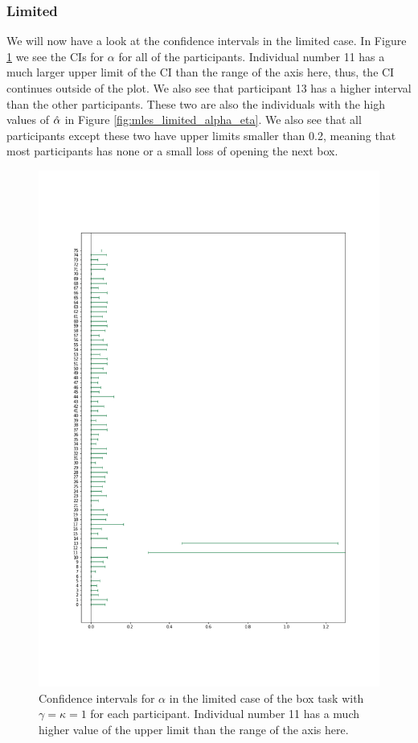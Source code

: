 \subsubsection{Limited}
We will now have a look at the confidence intervals in the limited case. In Figure \ref{fig:all_cis_alpha_lim} we see the CIs for $\alpha$ for all of the participants. Individual number 11 has a much larger upper limit of the CI than the range of the axis here, thus, the CI continues outside of the plot. We also see that participant 13 has a higher interval than the other participants. These two are also the individuals with the high values of $\hat{\alpha}$ in Figure \ref{fig:mles_limited_alpha_eta}. We also see that all participants except these two have upper limits smaller than 0.2, meaning that most participants has none or a small loss of opening the next box. 
\begin{figure}
    \centering
    \includegraphics[scale=0.37]{pictures/all_cis_lim_alpha.png} %
    \caption[CIs for $\alpha$, limited. $\gamma=\kappa=1$]{Confidence intervals for $\alpha$ in the limited case of the box task with $\gamma=\kappa=1$ for each participant. Individual number 11 has a much higher value of the upper limit than the range of the axis here. }
    \label{fig:all_cis_alpha_lim}
\end{figure}

